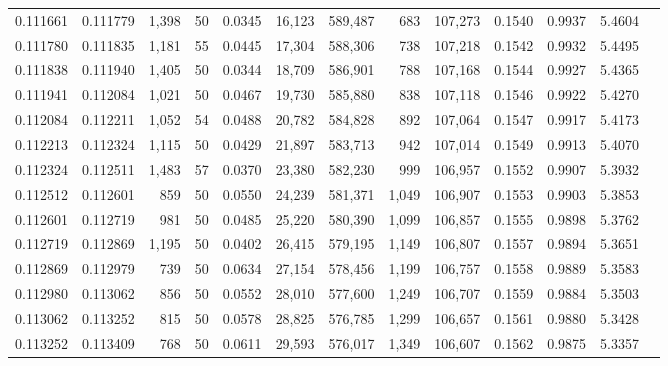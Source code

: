 \begin{tabular}{rrrrrrrrrrrrr}
0.111661 & 0.111779 & 1,398 &  50 &                                     0.0345 &  16,123 & 589,487 &     683 & 107,273 & 0.1540 & 0.9937 & 5.4604 \\
0.111780 & 0.111835 & 1,181 &  55 &                                     0.0445 &  17,304 & 588,306 &     738 & 107,218 & 0.1542 & 0.9932 & 5.4495 \\
0.111838 & 0.111940 & 1,405 &  50 &                                     0.0344 &  18,709 & 586,901 &     788 & 107,168 & 0.1544 & 0.9927 & 5.4365 \\
0.111941 & 0.112084 & 1,021 &  50 &                                     0.0467 &  19,730 & 585,880 &     838 & 107,118 & 0.1546 & 0.9922 & 5.4270 \\
0.112084 & 0.112211 & 1,052 &  54 &                                     0.0488 &  20,782 & 584,828 &     892 & 107,064 & 0.1547 & 0.9917 & 5.4173 \\
0.112213 & 0.112324 & 1,115 &  50 &                                     0.0429 &  21,897 & 583,713 &     942 & 107,014 & 0.1549 & 0.9913 & 5.4070 \\
0.112324 & 0.112511 & 1,483 &  57 &                                     0.0370 &  23,380 & 582,230 &     999 & 106,957 & 0.1552 & 0.9907 & 5.3932 \\
0.112512 & 0.112601 &   859 &  50 &                                     0.0550 &  24,239 & 581,371 &   1,049 & 106,907 & 0.1553 & 0.9903 & 5.3853 \\
0.112601 & 0.112719 &   981 &  50 &                                     0.0485 &  25,220 & 580,390 &   1,099 & 106,857 & 0.1555 & 0.9898 & 5.3762 \\
0.112719 & 0.112869 & 1,195 &  50 &                                     0.0402 &  26,415 & 579,195 &   1,149 & 106,807 & 0.1557 & 0.9894 & 5.3651 \\
0.112869 & 0.112979 &   739 &  50 &                                     0.0634 &  27,154 & 578,456 &   1,199 & 106,757 & 0.1558 & 0.9889 & 5.3583 \\
0.112980 & 0.113062 &   856 &  50 &                                     0.0552 &  28,010 & 577,600 &   1,249 & 106,707 & 0.1559 & 0.9884 & 5.3503 \\
0.113062 & 0.113252 &   815 &  50 &                                     0.0578 &  28,825 & 576,785 &   1,299 & 106,657 & 0.1561 & 0.9880 & 5.3428 \\
0.113252 & 0.113409 &   768 &  50 &                                     0.0611 &  29,593 & 576,017 &   1,349 & 106,607 & 0.1562 & 0.9875 & 5.3357 \\

\end{tabular}
